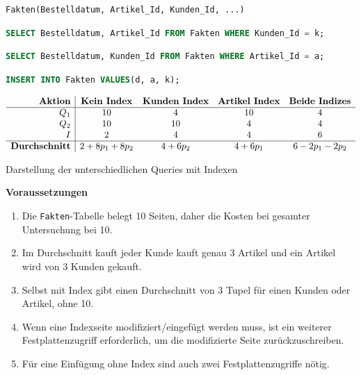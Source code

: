 \begin{lstlisting}[caption=Deklaration der Beispieltabelle Fakten,label={lst:declaration-fakten}]
Fakten(Bestelldatum, Artikel_Id, Kunden_Id, ...)
\end{lstlisting}

\begin{lstlisting}[language=SQL,caption=1. Select-Query für Fakten,label={lst:fakten-select-query-kunden}]
SELECT Bestelldatum, Artikel_Id FROM Fakten WHERE Kunden_Id = k;
\end{lstlisting}

\begin{lstlisting}[language=SQL,caption=2. Select-Query für Fakten,label={lst:fakten-select-query-artikel}]
SELECT Bestelldatum, Kunden_Id FROM Fakten WHERE Artikel_Id = a;
\end{lstlisting}

\begin{lstlisting}[language=SQL,caption=Insert-Query für Fakten,label={lst:fakten-insert-query}]
INSERT INTO Fakten VALUES(d, a, k);
\end{lstlisting}

\begin{table}[h!]
    \centering
    \setlength{\arrayrulewidth}{0.4mm}
    \[
        \begin{array}{r|c c c c}
            \textbf{Aktion} & \textbf{Kein Index} & \textbf{Kunden Index} & \textbf{Artikel Index} & \textbf{Beide Indizes} \\ \hline
            Q_1 & 10 & 4 & 10 & 4 \\
            Q_2 & 10 & 10 & 4 & 4 \\
            I   & 2  & 4  & 4  & 6 \\ \hline
            \textbf{Durchschnitt} & 2 + 8p_1 + 8p_2 & 4 + 6p_2 & 4 + 6p_1 & 6-2p_1-2p_2 \\
        \end{array}
    \]
    \caption[Performance-Vergleich]{Darstellung der unterschiedlichen Queries mit Indexen}
    \label{tab:performance-queries}
\end{table}

\textbf{Voraussetzungen}
\begin{enumerate}
    \item Die \texttt{Fakten}-Tabelle belegt 10 Seiten, daher die Kosten bei gesamter Untersuchung bei 10.
    \item Im Durchschnitt kauft jeder Kunde kauft genau 3 Artikel und ein Artikel wird von 3 Kunden gekauft.
    \item Selbst mit Index gibt einen Durchschnitt von 3 Tupel für einen Kunden oder Artikel, ohne 10.
    \item Wenn eine Indexseite modifiziert/eingefügt werden muss, ist ein weiterer Festplattenzugriff erforderlich, um die modifizierte Seite zurückzuschreiben.
    \item Für eine Einfügung ohne Index sind auch zwei Festplattenzugriffe nötig.
\end{enumerate}

